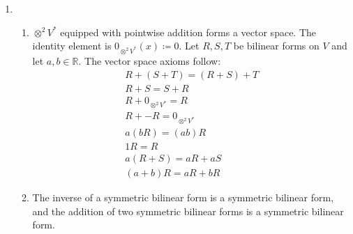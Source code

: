 \documentclass[a4paper, 12pt]{article}
\newcommand{\R}{\mathbb{R}}
\begin{document}
\begin{enumerate}

\item \begin{enumerate}

\item \(\otimes^2V^*\) equipped with pointwise addition forms a vector space. The identity element is \(0_{\otimes^2V^*}(x)\coloneqq0\). Let \(R,S,T\) be bilinear forms on \(V\) and let \(a,b\in\R\). The vector space axioms follow:
\begin{gather*}
R+(S+T)=(R+S)+T\\
R+S=S+R\\
R+0_{\otimes^2V^*}=R\\
R+-R=0_{\otimes^2V^*}\\
a(bR)=(ab)R\\
1R=R\\
a(R+S)=aR+aS\\
(a+b)R=aR+bR
\end{gather*}

\item The inverse of a symmetric bilinear form is a symmetric bilinear form, and the addition of two symmetric bilinear forms is a symmetric bilinear form.

\end{enumerate}

\end{enumerate}
\end{document}
